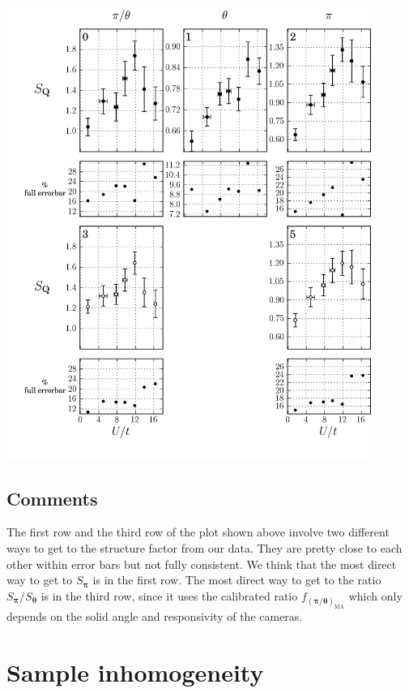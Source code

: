 \documentclass[11pt,letter]{article}
\newcommand{\bv}[1]{\ensuremath{\bm{#1}}}
\newcommand{\fma}[1]{\ensuremath{f_{\bv{#1}_{\text{MA}}} }}
\begin{document}
{\centering
\includegraphics[width=0.9\textwidth]{figures_140128/sdat_average_m.png}}


\subsection{Comments} 

The first row and the third row of the plot shown above involve two different
ways to get to the structure factor from our data.   They are pretty close to
each other within error bars but not fully consistent.   We think that the most
direct way to get to $S_{\bv{\pi}}$ is in the first row.   The most direct way
to get to the ratio $S_{\bv{\pi}}/S_{\bv{\theta}}$ is in the third row, since
it uses the calibrated ratio $\fma{(\pi/\theta)}$ which only depends on the
solid angle and responsivity of the cameras.  



\section{Sample inhomogeneity} 
\end{document}
